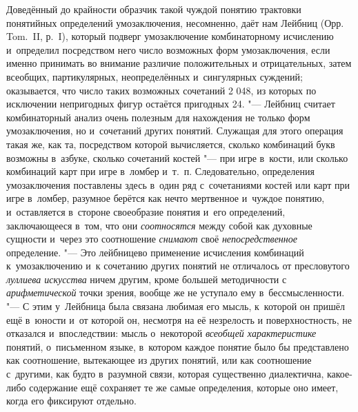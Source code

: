Доведённый до крайности образчик такой чуждой понятию
трактовки понятийных определений умозаключения, несомненно, даёт нам Лейбниц
(Орр. Tom.~II, р.~I), который подверг умозаключение
комбинаторному исчислению и~определил посредством него число возможных форм
умозаключения, если именно принимать во внимание различие положительных и
отрицательных, затем всеобщих, партикулярных, неопределённых и~сингулярных
суждений; оказывается, что число таких возможных сочетаний 2 048, из
которых по исключении непригодных фигур остаётся пригодных 24. "---
Лейбниц считает комбинаторный анализ очень полезным для
нахождения не только форм умозаключения, но и~сочетаний других понятий.
Служащая для этого операция такая же, как та, посредством которой
вычисляется, сколько комбинаций букв возможны в~азбуке, сколько сочетаний
костей "--- при игре в~кости, или сколько комбинаций карт при
игре в~ломбер и~т.~п. Следовательно, определения умозаключения поставлены
здесь в~один ряд с~сочетаниями костей или карт при игре в~ломбер, разумное
берётся как нечто мертвенное и~чуждое понятию, и~оставляется в~стороне
своеобразие понятия и~его определений, заключающееся в~том, что они
{\em соотносятся} между
собой как духовные сущности и~через это соотношение
{\em снимают} своё
{\em непосредственное}
определение. "--- Это лейбницево
применение исчисления комбинаций к~умозаключению и~к сочетанию других
понятий не отличалось от пресловутого
{\em луллиева искусства}
ничем другим, кроме большей методичности с
{\em арифметической}
точки зрения, вообще же не уступало ему в~бессмысленности. "---
С этим у~Лейбница была связана любимая его мысль, к~которой
он пришёл ещё в~юности и~от которой он, несмотря на её незрелость и
поверхностность, не отказался и~впоследствии: мысль о~некоторой
{\em всеобщей характеристике}
понятий, о~письменном языке, в~котором каждое понятие было бы
представлено как соотношение, вытекающее из других понятий, или как
соотношение с~другими, как будто в~разумной связи, которая существенно
диалектична, какое-либо содержание ещё сохраняет те же самые определения,
которые оно имеет, когда его фиксируют отдельно.

